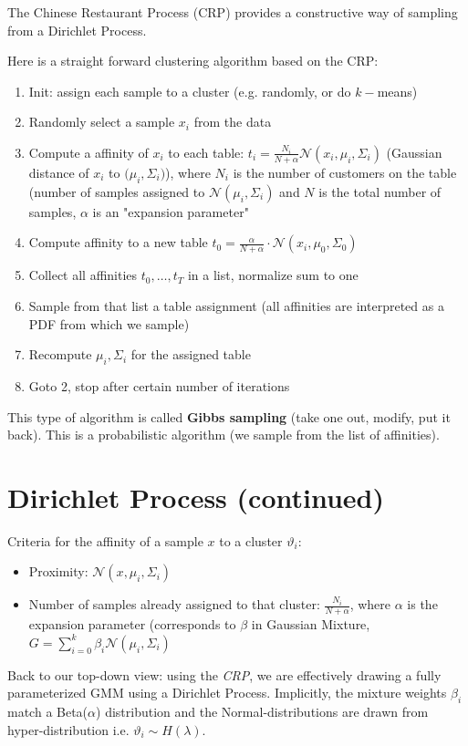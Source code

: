\documentclass{scrartcl}
\begin{document}
The Chinese Restaurant Process (CRP) provides a constructive way of sampling from a Dirichlet Process.

Here is a straight forward clustering algorithm based on the CRP:

\begin{enumerate}
    \item
        Init: assign each sample to a cluster (e.g. randomly, or do \(k-\)means)
    \item
        Randomly select a sample \(x_i\) from the data
    \item
        Compute a affinity of \(x_i\) to each table: \(t_i = \frac{N_i}{N+\alpha} \mathcal{N}(x_i, \mu_i, \Sigma_i)\) (Gaussian distance of \(x_i\) to \(\mathcal(\mu_i, \Sigma_i)\)), where \(N_i\) is the number of customers on the table (number of samples assigned to \(\mathcal{N}(\mu_i, \Sigma_i)\) and \(N\) is the total number of samples, \(\alpha\) is an "expansion parameter"
    \item
        Compute affinity to a new table \(t_0 = \frac{\alpha}{N + \alpha} \cdot \mathcal{N}(x_i, \mu_0, \Sigma_0)\)
    \item
        Collect all affinities \(t_0, \dots, t_T\) in a list, normalize sum to one
    \item
        Sample from that list a table assignment (all affinities are interpreted as a PDF from which we sample)
    \item
        Recompute \(\mu_i, \Sigma_i\) for the assigned table
    \item
        Goto 2, stop after certain number of iterations
\end{enumerate}

This type of algorithm is called \textbf{Gibbs sampling} (take one out, modify, put it back). This is a probabilistic algorithm (we sample from the list of affinities).

\section{Dirichlet Process (continued)}
Criteria for the affinity of a sample \(x\) to a cluster \(\vartheta_i\):
\begin{itemize}
    \item
        Proximity: \(\mathcal{N}(x, \mu_i, \Sigma_i)\)
    \item
        Number of samples already assigned to that cluster: \(\frac{N_i}{N+\alpha}\), where \(\alpha\) is the expansion parameter (corresponds to \(\beta\) in Gaussian Mixture, \(G = \sum_{i=0}^k \beta_i \mathcal{N}(\mu_i, \Sigma_i)\)
\end{itemize}
Back to our top-down view: using the \textit{CRP}, we are effectively drawing a fully parameterized GMM using a Dirichlet Process. Implicitly, the mixture weights \(\beta_i\) match a Beta(\(\alpha\)) distribution and the Normal-distributions are drawn from hyper-distribution i.e. \(\vartheta_i \sim H(\lambda)\).
\end{document}
